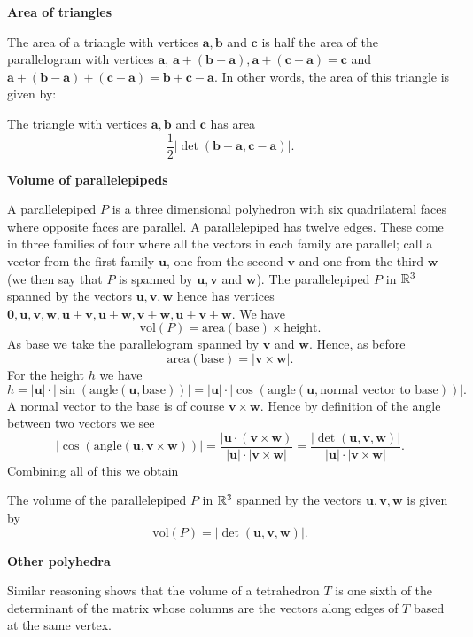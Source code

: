 \documentclass[10pt, a4paper]{article}
\newcommand{\mbf}[1]{\mathbf{#1}}
\begin{document}
\textbf{Area of triangles}

The area of a triangle with vertices $\mbf{a, b}$ and $\mbf{c}$ is half the area of the parallelogram with vertices $\mbf{a}$,
$\mbf{a + (b - a)}, \mbf{a + (c - a)} = \mbf{c}$ and $\mbf{a + (b - a) + (c - a)} = \mbf{b + c - a}$.
In other words,
the area of this triangle is given by:
\begin{proposition}
    The triangle with vertices $\mbf{a, b}$ and $\mbf{c}$ has area
    \[
    \frac{1}{2}|\det(\mbf{b - a, c - a})|.
    \]
\end{proposition}

\textbf{Volume of parallelepipeds}

A parallelepiped $P$ is a three dimensional polyhedron with six quadrilateral faces where opposite faces are parallel.
A parallelepiped has twelve edges.
These come in three families of four where all the vectors in each family are parallel;
call a vector from the first family $\mbf{u}$,
one from the second $\mbf{v}$ and one from the third $\mbf{w}$
(we then say that $P$ is spanned by $\mbf{u, v}$ and $\mbf{w}$).
The parallelepiped $P$ in $\mathbb{R} ^ 3$ spanned by the vectors $\mbf{u, v, w}$ hence has vertices $\mbf{0, u, v, w, u + v, u + w, v + w, u + v + w}$.
We have
\[
\mathrm{vol}(P) = \mathrm{area}(\text{base}) \times \text{height}.
\]
As base we take the parallelogram spanned by $\mbf{v}$ and $\mbf{w}$.
Hence, as before
\[
\mathrm{area}(\text{base}) = |\mbf{v \times w}|.
\]
For the height $h$ we have
\[
h = |\mbf{u}| \cdot |\sin(\mathrm{angle}(\mbf{u}, \text{base}))| = |\mbf{u}| \cdot |\cos(\mathrm{angle}(\mbf{u}, \text{normal vector to base}))|.
\]
A normal vector to the base is of course $\mbf{v \times w}$.
Hence by definition of the angle between two vectors we see
\[
|\cos(\mathrm{angle}(\mbf{u}, \mbf{v} \times \mbf{w}))| = \frac{|\mbf{u} \cdot (\mbf{v} \times \mbf{w})}{|\mbf{u}| \cdot |\mbf{v} \times \mbf{w}|} = \frac{|\det(\mbf{u}, \mbf{v}, \mbf{w})|}{|\mbf{u}| \cdot |\mbf{v} \times \mbf{w}|}.
\]
Combining all of this we obtain
\begin{proposition}
    The volume of the parallelepiped $P$ in $\mathbb{R} ^ 3$ spanned by the vectors $\mbf{u, v, w}$ is given by
    \[
    \mathrm{vol}(P) = |\det(\mbf{u, v, w})|.
    \]
\end{proposition}

\textbf{Other polyhedra}

Similar reasoning shows that the volume of a tetrahedron $T$ is one sixth of the determinant of the matrix whose columns are the vectors along edges of $T$ based at the same vertex.
\end{document}
